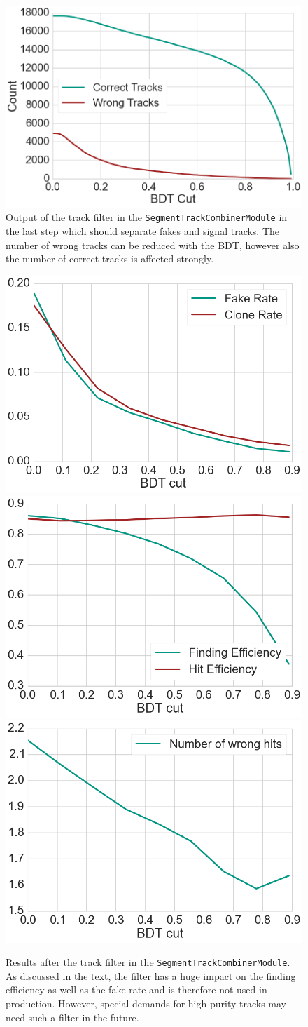 \begin{figure}
  \centering
  \includegraphics[width=0.7\linewidth]{figures/workflow/track_filter_count.png}
  \caption{Output of the track filter in the \texttt{SegmentTrackCombinerModule} in the last step which should separate fakes and signal tracks. The number of wrong tracks can be reduced with the BDT, however also the number of correct tracks is affected strongly.}
  \label{fig-track-filter-count}
\end{figure}

\begin{figure}
  \centering
  \includegraphics[width=0.48\linewidth]{figures/workflow/track_filter_rate.png}
  \includegraphics[width=0.48\linewidth]{figures/workflow/track_filter_efficiency.png}
  \includegraphics[width=0.48\linewidth]{figures/workflow/track_filter_wrong_hits.png}
  \caption{Results after the track filter in the \texttt{SegmentTrackCombinerModule}. As discussed in the text, the filter has a huge impact on the finding efficiency as well as the fake rate and is therefore not used in production. However, special demands for high-purity tracks may need such a filter in the future.}
  \label{fig-track-filter-results}
\end{figure}


